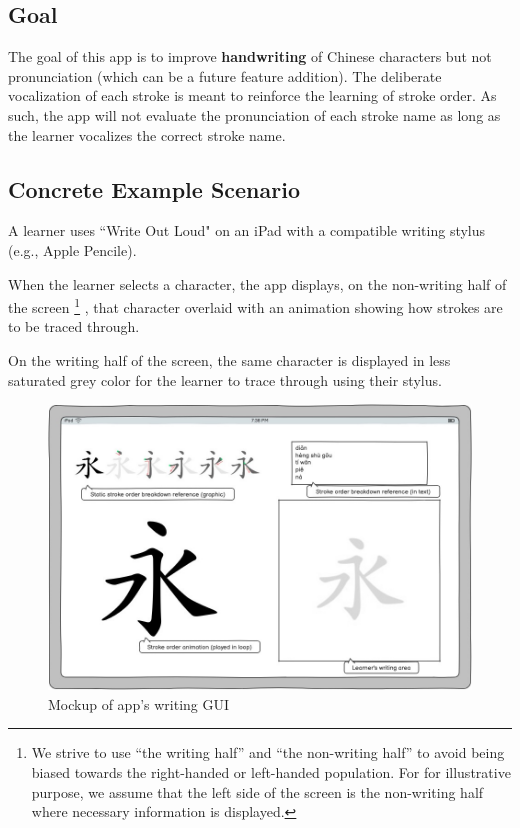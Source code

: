 \documentclass{article}
\begin{document}
\subsection*{Goal}
The goal of this app is to improve \textbf{handwriting} of Chinese characters but not pronunciation (which can be a
future feature addition).  The deliberate vocalization of each stroke is meant to reinforce the learning of stroke
order. As such, the app will not evaluate the pronunciation of each stroke name as long as the learner vocalizes the
correct stroke name. 

\subsection*{Concrete Example Scenario}

A learner uses ``Write Out Loud" on an iPad with a compatible writing stylus (e.g., Apple Pencile).

When the learner selects a character, the app displays, on the non-writing half of the screen
\footnote{We strive to use ``the writing half'' and ``the non-writing half'' to avoid being biased towards the right-handed or left-handed population. For for illustrative purpose, we assume that the left side of the screen is the non-writing half where necessary information is displayed.}
, that character overlaid with an animation showing how strokes are to be traced through.

On the writing half of the screen, the same character is displayed in less saturated grey color for the learner to trace
through using their stylus.

\begin{figure}[h]
    \centering
    \includegraphics[width=0.75\columnwidth]{Assets/App_Mockup.jpg}
    \caption{Mockup of app's writing GUI}
\end{figure}
\end{document}
